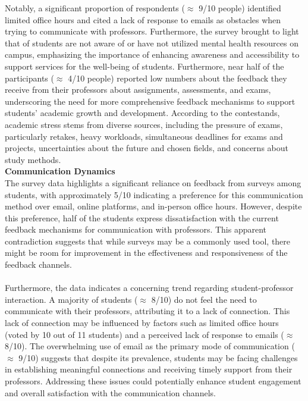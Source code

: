 \documentclass[11pt]{report}
\begin{document}
Notably, a significant proportion of respondents ($\approx$ 9/10 people) identified limited office hours and cited a lack of response to emails as obstacles when trying to communicate with professors. Furthermore, the survey brought to light that  of students are not aware of or have not utilized mental health resources on campus, emphasizing the importance of enhancing awareness and accessibility to support services for the well-being of students. Furthermore, near half of the participants ($\approx$ 4/10 people) reported low numbers about the feedback they receive from their professors about assignments, assessments, and exams, underscoring the need for more comprehensive feedback mechanisms to support students' academic growth and development. According to the contestands, academic stress stems from diverse sources, including the pressure of exams, particularly retakes, heavy workloads, simultaneous deadlines for exams and projects, uncertainties about the future and chosen fields, and concerns about study methods.\vspace{5mm} \\
\textbf{Communication Dynamics} \\
The survey data highlights a significant reliance on feedback from surveys among students, with approximately 5/10 indicating a preference for this communication method over email, online platforms, and in-person office hours. However, despite this preference, half of the students express dissatisfaction with the current feedback mechanisms for communication with professors. This apparent contradiction suggests that while surveys may be a commonly used tool, there might be room for improvement in the effectiveness and responsiveness of the feedback channels.\\ \\
Furthermore, the data indicates a concerning trend regarding student-professor interaction. A majority of students ($\approx$ 8/10) do not feel the need to communicate with their professors, attributing it to a lack of connection. This lack of connection may be influenced by factors such as limited office hours (voted by 10 out of 11 students) and a perceived lack of response to emails ($\approx$ 8/10). The overwhelming use of email as the primary mode of communication ($\approx$ 9/10) suggests that despite its prevalence, students may be facing challenges in establishing meaningful connections and receiving timely support from their professors. Addressing these issues could potentially enhance student engagement and overall satisfaction with the communication channels.\vspace{5mm} \\
\end{document}
